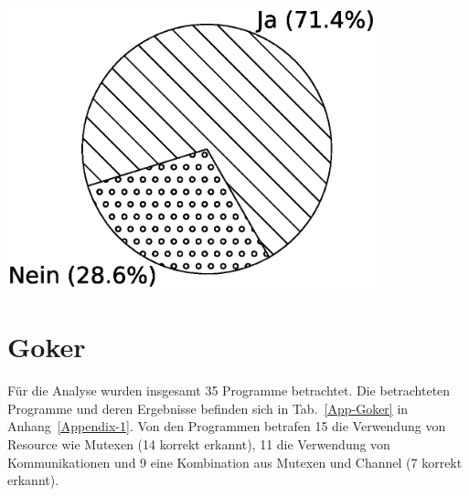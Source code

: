 \hfill
\begin{minipage}{0.45\textwidth}
  \centering
  \includegraphics[width=0.8\textwidth]{img/pi_standard_mix.eps}
  \label{Chap:Eval-Sec:Stand-Fig:Mix}
\end{minipage}

\section{Goker}
Für die Analyse wurden insgesamt 35 Programme betrachtet. Die betrachteten 
Programme und deren Ergebnisse befinden sich in Tab.~\ref{App-Goker} 
in Anhang~\ref{Appendix-1}. Von den Programmen betrafen 15 die 
Verwendung von Resource wie Mutexen (14 korrekt erkannt), 11 die 
Verwendung von Kommunikationen und 9 eine Kombination aus Mutexen und 
Channel (7 korrekt erkannt). \\

